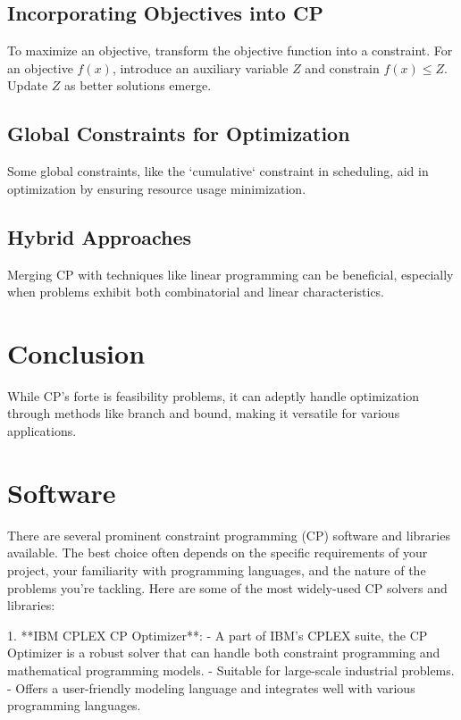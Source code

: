 \subsection{Incorporating Objectives into CP}

To maximize an objective, transform the objective function into a constraint. For an objective \( f(x) \), introduce an auxiliary variable \( Z \) and constrain \( f(x) \leq Z \). Update \( Z \) as better solutions emerge.

\subsection{Global Constraints for Optimization}

Some global constraints, like the `cumulative` constraint in scheduling, aid in optimization by ensuring resource usage minimization.

\subsection{Hybrid Approaches}

Merging CP with techniques like linear programming can be beneficial, especially when problems exhibit both combinatorial and linear characteristics.

\section*{Conclusion}

While CP's forte is feasibility problems, it can adeptly handle optimization through methods like branch and bound, making it versatile for various applications.


\section{Software}
There are several prominent constraint programming (CP) software and libraries available. The best choice often depends on the specific requirements of your project, your familiarity with programming languages, and the nature of the problems you're tackling. Here are some of the most widely-used CP solvers and libraries:

1. **IBM CPLEX CP Optimizer**: 
   - A part of IBM's CPLEX suite, the CP Optimizer is a robust solver that can handle both constraint programming and mathematical programming models.
   - Suitable for large-scale industrial problems.
   - Offers a user-friendly modeling language and integrates well with various programming languages.

